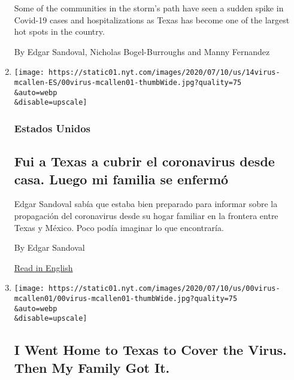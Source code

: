 \begin{enumerate}
  Some of the communities in the storm's path have seen a sudden spike
  in Covid-19 cases and hospitalizations as Texas has become one of the
  largest hot spots in the country.

  By Edgar Sandoval, Nicholas Bogel-Burroughs and Manny Fernandez
\item
  \href{/es/2020/07/14/espanol/texas-coronavirus-rio-grande-valley.html}{}

  \texttt{[image: https://static01.nyt.com/images/2020/07/10/us/14virus-mcallen-ES/00virus-mcallen01-thumbWide.jpg?quality=75\\\&auto=webp\\\&disable=upscale]}

  \hypertarget{estados-unidos}{%
  \subsubsection{Estados Unidos}\label{estados-unidos}}

  \hypertarget{fui-a-texas-a-cubrir-el-coronavirus-desde-casa-luego-mi-familia-se-enfermuxf3}{%
  \subsection{Fui a Texas a cubrir el coronavirus desde casa. Luego mi
  familia se
  enfermó}\label{fui-a-texas-a-cubrir-el-coronavirus-desde-casa-luego-mi-familia-se-enfermuxf3}}

  Edgar Sandoval sabía que estaba bien preparado para informar sobre la
  propagación del coronavirus desde su hogar familiar en la frontera
  entre Texas y México. Poco podía imaginar lo que encontraría.

  By Edgar Sandoval

  \href{https://www.nytimes.com/2020/07/14/us/coronavirus-texas-rio-grande-valley-border.html}{Read
  in English}
\item
  \href{/2020/07/14/us/coronavirus-texas-rio-grande-valley-border.html}{}

  \texttt{[image: https://static01.nyt.com/images/2020/07/10/us/00virus-mcallen01/00virus-mcallen01-thumbWide.jpg?quality=75\\\&auto=webp\\\&disable=upscale]}

  \hypertarget{i-went-home-to-texas-to-cover-the-virus-then-my-family-got-it}{%
  \subsection{I Went Home to Texas to Cover the Virus. Then My Family
  Got
  It.}\label{i-went-home-to-texas-to-cover-the-virus-then-my-family-got-it}}


\end{enumerate}
